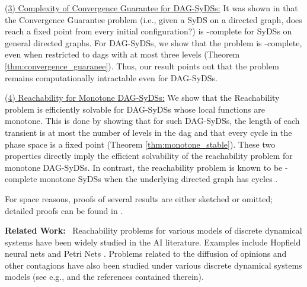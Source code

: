 \smallskip

\noindent
\underline{(3) Complexity of Convergence Guarantee for DAG-SyDSs:}
It was shown in \cite{Chistikov-etal-2020} that
the Convergence Guarantee problem 
(i.e., given a SyDS \cals{} on
a directed graph, does \cals{} reach a fixed point from every
initial configuration?)  
is \cpsp-complete for SyDSs on general directed graphs.
For DAG-SyDSs, we show that the problem is \cconp-complete,
even when restricted to dags with at most  three levels 
(Theorem \ref{thm:convergence_guaranee}).
Thus, our result points out that the problem remains 
computationally intractable even for DAG-SyDSs.

\smallskip

\noindent
\underline{(4) Reachability for Monotone DAG-SyDSs:} 
We show that the Reachability problem is efficiently solvable for
DAG-SyDSs whose local functions are monotone. 
This is done by showing that for such DAG-SyDSs, the length
of each transient is at most the number of levels in the dag and
that every cycle in the
phase space is a fixed point (Theorem \ref{thm:monotone_stable}).
These two properties directly imply
the efficient solvability of the reachability
problem for monotone DAG-SyDSs.
In contrast, the reachability problem is known to be
\cpsp-complete monotone SyDSs when the underlying
directed graph has cycles \cite{OU-2017}.

For space reasons, proofs of several results
are either sketched or omitted; detailed 
proofs can be found in \cite{Rosenkrantz-etal-2020}.

\iffalse
The results in \cite{Rosenkrantz-etal-2018} readily imply
that the Reachability problem for SyDSs whose local
functions are NCFs and whose directed graphs may contain cycles  
is \cpsp-complete.
To our knowledge, the only previous result on the efficient
solvability of the  Reachability problem for DAG-SyDSs is
for the case when each local function is a bithreshold
function \cite{KKM+2013}.

 we show
that the length of every phase space cycle is at most 2.
Moreover, if the number of levels of  \cals{} is $L$,
no transient is longer than $2L-1$
(Theorem \ref{thm:NCF_phase_space}).
These properties
directly imply the efficient solvability of the reachability
problem for such DAG-SyDSs.
\fi

\smallskip

\noindent
\textbf{Related Work:}~ Reachability problems for various
models of discrete dynamical systems have been widely studied
in the AI literature.
Examples include 
Hopfield neural nets \cite{FO-1989,Orponen-1993,Orponen-1994}
and Petri Nets \cite{Esparza-etal-1994}.
Problems related to the diffusion of opinions and other contagions have
also been studied under various discrete dynamical systems
models (see e.g., 
\cite{Auletta-etal-2018,Botan-etal-2019,Chistikov-etal-2020,BE-2017}
and the references contained therein).

